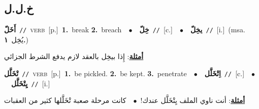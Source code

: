 \documentclass[10pt,a4paper,twoside]{article} %
\begin{document}
\begin{multicols}{2}
\vspace{-3mm}
\subsection*{\color{blue}\foreignlanguage{arabic}{خ.ل.ل}\color{blue}{}} 

{\setlength\topsep{0pt}\textbf{\foreignlanguage{arabic}{أَخَلّ}}\ {\color{gray}\texttt{//}\color{black}}\ \textsc{verb}\ [p.]\ \textbf{1.}~break  \textbf{2.}~breach\ \ $\bullet$\ \ \setlength\topsep{0pt}\textbf{\foreignlanguage{arabic}{خِلّ}}\ {\color{gray}\texttt{//}\color{black}}\ [c.]\ \ $\bullet$\ \ \setlength\topsep{0pt}\textbf{\foreignlanguage{arabic}{يخِلّ}}\ {\color{gray}\texttt{//}\color{black}}\ [i.]\ \color{gray}(msa. \foreignlanguage{arabic}{يُخِل}~\foreignlanguage{arabic}{\textbf{١.}})\color{black}\  \begin{flushright}\color{gray}\foreignlanguage{arabic}{\textbf{\underline{\foreignlanguage{arabic}{أمثلة}}}: إِذا بيخِل بالعقد لازم يدفع الشرط الجزائي}\end{flushright}\color{black}} \vspace{2mm}

{\setlength\topsep{0pt}\textbf{\foreignlanguage{arabic}{تْخَلَّل}}\ {\color{gray}\texttt{//}\color{black}}\ \textsc{verb}\ [p.]\ \textbf{1.}~be pickled.  \textbf{2.}~be kept.  \textbf{3.}~penetrate\ \ $\bullet$\ \ \setlength\topsep{0pt}\textbf{\foreignlanguage{arabic}{اِتْخَلَّل}}\ {\color{gray}\texttt{//}\color{black}}\ [c.]\ \ $\bullet$\ \ \setlength\topsep{0pt}\textbf{\foreignlanguage{arabic}{يِتْخَلَّل}}\ {\color{gray}\texttt{//}\color{black}}\ [i.]\  \begin{flushright}\color{gray}\foreignlanguage{arabic}{\textbf{\underline{\foreignlanguage{arabic}{أمثلة}}}: أنت ناوي الملف يِتْخَلَّل عندك!\ $\bullet$\ \  كانت مرحلة صعبة تْخَلَّلها كثير من العقبات}\end{flushright}\color{black}} \vspace{2mm}


\end{multicols}
\end{document}
